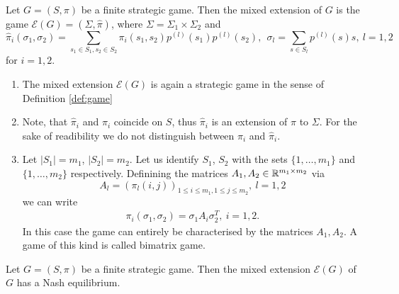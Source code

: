 \begin{definition}
    Let $G = (S, \pi)$ be a finite strategic game. Then the mixed extension of $G$ is the game $\mathcal{E}(G) = (\Sigma, \hat{\pi})$, where 
    $\Sigma = \Sigma_{1}\times\Sigma_{2}$ and 
    \begin{equation*}
         \hat{\pi}_{i}(\sigma_{1}, \sigma_{2}) 
            = \sum_{s_{1}\in S_{1}, s_{2}\in S_{2}}\pi_{i}(s_{1}, s_{2})p^{(l)}(s_{1})p^{(l)}(s_{2}), ~~ \sigma_{l} = \sum_{s\in S_{l}}p^{(l)}(s)s, ~l = 1, 2
    \end{equation*}
    for $i = 1, 2$.
\end{definition}

\begin{remark}
    \begin{enumerate}
        \item The mixed extension $\mathcal{E}(G)$ is again a strategic game in the sense of Definition \ref{def:game}
        \item Note, that $\hat{\pi}_{i}$ and $\pi_{i}$ coincide on $S$, thus $\hat{\pi}_{i}$ is an extension of $\pi$ to $\Sigma$. For the sake of readibility
            we do not distinguish between $\pi_{i}$ and $\hat{\pi}_{i}$.
        \item Let $|S_{1}| = m_{1}$, $|S_{2}| = m_{2}$. Let us identify $S_{1}$, $S_{2}$ with the sets $\{1, \ldots, m_{1}\}$
            and $\{1, \ldots, m_{2}\}$ respectively. Definining the matrices $A_{1}, A_{2}\in\mathbb{R}^{m_{1}\times m_{2}}$ via
            \begin{equation*}
                A_{l} = (\pi_{l}(i, j))_{1\leq i\leq m_{1}, 1\leq j\leq m_{2}}, ~l = 1, 2
            \end{equation*}
            we can write
            \begin{align*}
                \pi_{i}(\sigma_{1}, \sigma_{2}) = \sigma_{1}A_{i}\sigma_{2}^{T}, ~ i = 1, 2.
            \end{align*}
            In this case the game can entirely be characterised by the matrices $A_{1}, A_{2}$. A game of this kind is called bimatrix game.
    \end{enumerate}
\end{remark}

\begin{corollary}
    Let $G = (S, \pi)$ be a finite strategic game. Then the mixed extension $\mathcal{E}(G)$ of $G$ has a Nash equilibrium.
\end{corollary}

